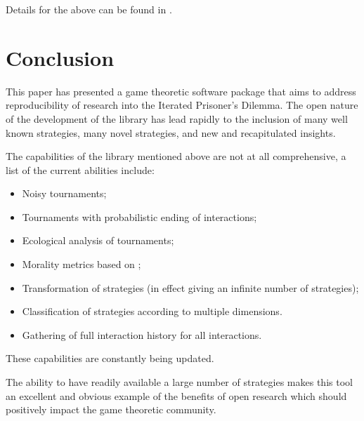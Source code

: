 \documentclass{article}
\begin{document}
Details for the above can be found in \cite{Harper2015}.

\section{Conclusion}\label{sec:conclusion}

This paper has presented a game theoretic software package that aims to address
reproducibility of research into the Iterated Prisoner's Dilemma. The open
nature of the development of the library has lead rapidly to the inclusion of
many well known strategies, many novel strategies, and new and recapitulated
insights.

The capabilities of the library mentioned above are not at all comprehensive, a
list of the current abilities include:

\begin{itemize}
    \item Noisy tournaments;
    \item Tournaments with probabilistic ending of interactions;
    \item Ecological analysis of tournaments;
    \item Morality metrics based on \cite{Singer-Clark2014};
    \item Transformation of strategies (in effect giving an infinite number of
        strategies);
    \item Classification of strategies according to multiple dimensions.
    \item Gathering of full interaction history for all interactions.
\end{itemize}

These capabilities are constantly being updated.

The ability to have readily available a large number of strategies makes this
tool an excellent and obvious example of the benefits of open research which
should positively impact the game theoretic community.

\printbibliography
\end{document}
